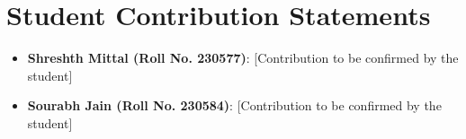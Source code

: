 \documentclass[12pt,onecolumn,draftclsnofoot]{IEEEtran}
\begin{document}
\section*{Student Contribution Statements}
\begin{itemize}
    \item \textbf{Shreshth Mittal (Roll No. 230577)}: [Contribution to be confirmed by the student]
    \item \textbf{Sourabh Jain (Roll No. 230584)}: [Contribution to be confirmed by the student]
\end{itemize}



\end{document}
